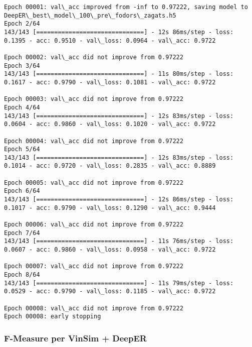 \documentclass[11pt]{article}
\begin{document}
\begin{Verbatim}[commandchars=\\\{\}]
Epoch 00001: val\_acc improved from -inf to 0.97222, saving model to DeepER\_best\_model\_100\_pre\_fodors\_zagats.h5
Epoch 2/64
143/143 [==============================] - 12s 86ms/step - loss: 0.1395 - acc: 0.9510 - val\_loss: 0.0964 - val\_acc: 0.9722

Epoch 00002: val\_acc did not improve from 0.97222
Epoch 3/64
143/143 [==============================] - 11s 80ms/step - loss: 0.1617 - acc: 0.9790 - val\_loss: 0.1081 - val\_acc: 0.9722

Epoch 00003: val\_acc did not improve from 0.97222
Epoch 4/64
143/143 [==============================] - 12s 83ms/step - loss: 0.0604 - acc: 0.9860 - val\_loss: 0.1020 - val\_acc: 0.9722

Epoch 00004: val\_acc did not improve from 0.97222
Epoch 5/64
143/143 [==============================] - 12s 83ms/step - loss: 0.1014 - acc: 0.9720 - val\_loss: 0.2835 - val\_acc: 0.8889

Epoch 00005: val\_acc did not improve from 0.97222
Epoch 6/64
143/143 [==============================] - 12s 86ms/step - loss: 0.1017 - acc: 0.9790 - val\_loss: 0.1290 - val\_acc: 0.9444

Epoch 00006: val\_acc did not improve from 0.97222
Epoch 7/64
143/143 [==============================] - 11s 76ms/step - loss: 0.0607 - acc: 0.9860 - val\_loss: 0.0958 - val\_acc: 0.9722

Epoch 00007: val\_acc did not improve from 0.97222
Epoch 8/64
143/143 [==============================] - 11s 79ms/step - loss: 0.0529 - acc: 0.9790 - val\_loss: 0.1185 - val\_acc: 0.9722

Epoch 00008: val\_acc did not improve from 0.97222
Epoch 00008: early stopping

    \end{Verbatim}

    \subsubsection{F-Measure per VinSim +
DeepER}\label{f-measure-per-vinsim-deeper}
\end{document}
